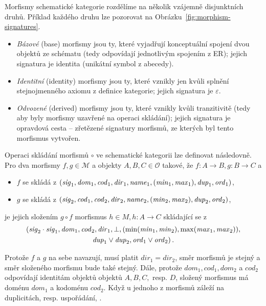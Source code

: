 Morfismy schematické kategorie rozdělíme na několik vzájemně disjunktních druhů.
Příklad každého druhu lze pozorovat na Obrázku~\ref{fig:morphism-signatures}.
\begin{itemize}
  \item \emph{Bázové} (base) morfismy jsou ty, které vyjadřují konceptuální spojení dvou objektů ze schématu (tedy odpovídají jednotlivým spojením z ER); jejich signatura je identita (unikátní symbol z abecedy).
  \item \emph{Identitní} (identity) morfismy jsou ty, které vznikly jen kvůli splnění stejnojmenného axiomu z definice kategorie; jejich signatura je $\varepsilon$.
  \item \emph{Odvozené} (derived) morfismy jsou ty, které vznikly kvůli tranzitivitě (tedy aby byly morfismy uzavřené na operaci skládání); jejich signatura je opravdová cesta -- zřetězené signatury morfismů, ze kterých byl tento morfismus vytvořen.
\end{itemize}

Operaci skládání morfismů $\circ$ ve schematické kategorii lze definovat následovně.
Pro dva morfismy $f,g\in\mathcal M$ a objekty $A,B,C\in \mathcal O$ takové, že $f\colon A\to B, g\colon B\to C$ a
\begin{itemize}
  \item $f$ se skládá z $(\mathit{sig}_1, \mathit{dom}_1, \mathit{cod}_1, \mathit{dir}_1, \mathit{name}_1, (\mathit{min}_1, \mathit{max}_1), \mathit{dup}_1, \mathit{ord}_1)$,
  \item $g$ se skládá z $(\mathit{sig}_2, \mathit{cod}_1, \mathit{cod}_2, \mathit{dir}_2, \mathit{name}_2, (\mathit{min}_2, \mathit{max}_2), \mathit{dup}_2, \mathit{ord}_2)$,
\end{itemize}
je jejich složením $g\circ f$ morfismus $h\in M, h\colon A\to C$ skládající se z
\begin{multline*}
  (\mathit{sig}_2\cdot \mathit{sig}_1, \mathit{dom}_1, \mathit{cod}_2, \mathit{dir}_1, \bot, (\min(\mathit{min}_1, \mathit{min}_2), \max(\mathit{max}_1, \mathit{max}_2)),\\
  \mathit{dup}_1 \lor \mathit{dup}_2, \mathit{ord}_1\lor \mathit{ord}_2)\,.
\end{multline*}

Protože $f$ a $g$ na sebe navazují, musí platit $dir_1=dir_2$, směr morfismů je stejný a směr složeného morfismu bude také stejný.
Dále, protože $dom_1, cod_1, dom_2$ a $cod_2$ odpovídají identitám objektů objektů $A, B, C,$ resp. $D$, složený morfismus má doménu $dom_1$ a kodoménu $cod_2$.
Když u jednoho z morfismů záleží na duplicitách, resp. uspořádání, .

